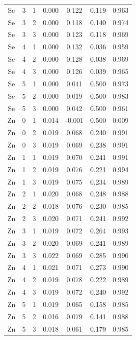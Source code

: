 \documentclass[ms, hidelinks]{uncgdissertationexp3}
\theoremstyle{plain}
\theoremstyle{definition}
\theoremstyle{remark}
\begin{document}
\begin{longtable}{ccccccc}
  Se & 3 & 1 & 0.000 & 0.122 & 0.119 & 0.963\\
  \rowcolor{gray!6}  Se & 3 & 2 & 0.000 & 0.118 & 0.140 & 0.974\\
  Se & 3 & 3 & 0.000 & 0.123 & 0.118 & 0.969\\
  \rowcolor{gray!6}  Se & 4 & 1 & 0.000 & 0.132 & 0.036 & 0.959\\
  Se & 4 & 2 & 0.000 & 0.128 & 0.038 & 0.969\\
  \rowcolor{gray!6}  Se & 4 & 3 & 0.000 & 0.126 & 0.039 & 0.965\\
  Se & 5 & 1 & 0.000 & 0.041 & 0.500 & 0.973\\
  \rowcolor{gray!6}  Se & 5 & 2 & 0.000 & 0.019 & 0.500 & 0.983\\
  Se & 5 & 3 & 0.000 & 0.042 & 0.500 & 0.961\\
  \rowcolor{gray!6}  Zn & 0 & 1 & 0.014 & -0.001 & 0.500 & 0.009\\
  Zn & 0 & 2 & 0.019 & 0.068 & 0.240 & 0.991\\
  \rowcolor{gray!6}  Zn & 0 & 3 & 0.019 & 0.069 & 0.238 & 0.991\\
  Zn & 1 & 1 & 0.019 & 0.070 & 0.241 & 0.991\\
  \rowcolor{gray!6}  Zn & 1 & 2 & 0.019 & 0.076 & 0.221 & 0.994\\
  Zn & 1 & 3 & 0.019 & 0.075 & 0.234 & 0.989\\
  \rowcolor{gray!6}  Zn & 2 & 1 & 0.020 & 0.068 & 0.248 & 0.988\\
  Zn & 2 & 2 & 0.018 & 0.076 & 0.230 & 0.985\\
  \rowcolor{gray!6}  Zn & 2 & 3 & 0.020 & 0.071 & 0.241 & 0.992\\
  Zn & 3 & 1 & 0.019 & 0.072 & 0.264 & 0.993\\
  \rowcolor{gray!6}  Zn & 3 & 2 & 0.020 & 0.069 & 0.241 & 0.989\\
  Zn & 3 & 3 & 0.022 & 0.069 & 0.285 & 0.990\\
  \rowcolor{gray!6}  Zn & 4 & 1 & 0.021 & 0.071 & 0.273 & 0.990\\
  Zn & 4 & 2 & 0.019 & 0.078 & 0.222 & 0.989\\
  \rowcolor{gray!6}  Zn & 4 & 3 & 0.019 & 0.072 & 0.240 & 0.992\\
  Zn & 5 & 1 & 0.019 & 0.065 & 0.158 & 0.985\\
  \rowcolor{gray!6}  Zn & 5 & 2 & 0.016 & 0.079 & 0.141 & 0.988\\
  Zn & 5 & 3 & 0.018 & 0.061 & 0.179 & 0.985\\*
  \end{longtable}
\end{document}
